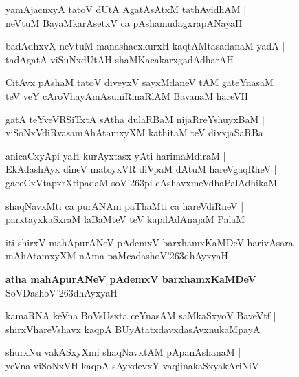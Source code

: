 \begin{shloka}
yamAjacnxyA tatoV dUtA AgatAsAtxM tathAvidhAM |\\
neVtuM BayaMkarAsetxV ca pAshamudagxrapANayaH
\end{shloka}

\begin{shloka}
badAdhxvX neVtuM manashacxkurxH kaqtAMtasadanaM yadA |\\
tadAgatA viSuNxdUtAH shaMKacakarxgadAdharAH
\end{shloka}

\begin{shloka}
CitAvx pAshaM tatoV diveyxV sayxMdaneV tAM gateYnasaM |\\
teV veY cAroVhayAmAsuniRmaRlAM BavanaM hareVH
\end{shloka}

\begin{shloka}
gatA teYveVRSiTxtA sAtha dulaRBaM nijaRreYshuyxBaM |\\
viSoNxVdiRvasamAhAtamxyXM kathitaM teV divxjaSaRBa
\end{shloka}

\begin{shloka}
anicaCxyApi yaH kurAyxtasx yAti harimaMdiraM |\\
EkAdashAyx dineV matoyxVR diVpaM dAtuM hareVgaqRheV |\\
gaceCxVtapxrXtipadaM soV\char'263pi cAshavxmeVdhaPalAdhikaM
\end{shloka}

\begin{shloka}
shaqNavxMti ca purANAni paThaMti ca hareVdiRneV |\\
parxtayxkaSxraM laBaMteV teV kapilAdAnajaM PalaM
\end{shloka}
iti shirxV mahApurANeV pAdemxV barxhamxKaMDeV harivAsara mAhAtamxyXM nAma paMcadashoV\char'263dhAyxyaH

\begin{center}
\textbf{\large atha mahApurANeV pAdemxV barxhamxKaMDeV}\\
SoVDashoV\char'263dhAyxyaH
\end{center}

\setcounter{shloka}{0}
\begin{shloka}
kamaRNA keVna BoVsUsxta ceYnasAM saMkaSxyoV BaveVtf |\\
shirxVhareVshavx kaqpA BUyAtatxdavxdasAvxnukaMpayA
\end{shloka}

\begin{shloka}
shurxNu vakASxyXmi shaqNavxtAM pApanAshanaM |\\
yeVna viSoNxVH kaqpA sAyxdevxY vaqjinakaSxyakAriNiV
\end{shloka}

